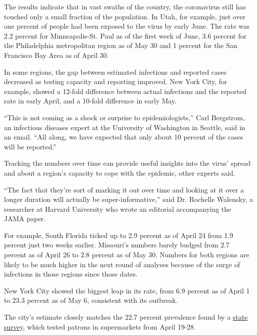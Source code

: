 The results indicate that in vast swaths of the country, the coronavirus
still has touched only a small fraction of the population. In Utah, for
example, just over one percent of people had been exposed to the virus
by early June. The rate was 2.2 percent for Minneapolis-St. Paul as of
the first week of June, 3.6 percent for the Philadelphia metropolitan
region as of May 30 and 1 percent for the San Francisco Bay Area as of
April 30.

In some regions, the gap between estimated infections and reported cases
decreased as testing capacity and reporting improved. New York City, for
example, showed a 12-fold difference between actual infections and the
reported rate in early April, and a 10-fold difference in early May.

``This is not coming as a shock or surprise to epidemiologists,'' Carl
Bergstrom, an infectious diseases expert at the University of Washington
in Seattle, said in an email. ``All along, we have expected that only
about 10 percent of the cases will be reported.''

Tracking the numbers over time can provide useful insights into the
virus' spread and about a region's capacity to cope with the epidemic,
other experts said.

``The fact that they're sort of marking it out over time and looking at
it over a longer duration will actually be super-informative,'' said Dr.
Rochelle Walensky, a researcher at Harvard University who wrote an
editorial accompanying the JAMA paper.

For example, South Florida ticked up to 2.9 percent as of April 24 from
1.9 percent just two weeks earlier. Missouri's numbers barely budged
from 2.7 percent as of April 26 to 2.8 percent as of May 30. Numbers for
both regions are likely to be much higher in the next round of analyses
because of the surge of infections in those regions since those dates.

New York City showed the biggest leap in its rate, from 6.9 percent as
of April 1 to 23.3 percent as of May 6, consistent with its outbreak.

The city's estimate closely matches the 22.7 percent prevalence found by
a
\href{https://www.sciencedirect.com/science/article/pii/S1047279720302015}{state
survey}, which tested patrons in supermarkets from April 19-28.

\href{https://www.nytimes.com/news-event/coronavirus?action=click\&pgtype=Article\&state=default\&region=MAIN_CONTENT_3\&context=storylines_faq}{}

